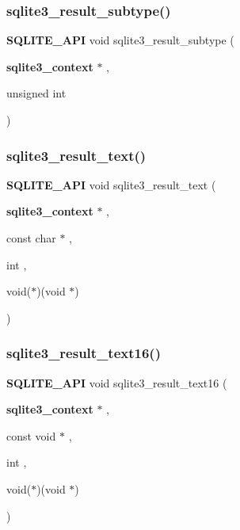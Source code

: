 \subsubsection{sqlite3\_result\_subtype()}
{\footnotesize\ttfamily \textbf{ S\+Q\+L\+I\+T\+E\+\_\+\+A\+PI} void sqlite3\+\_\+result\+\_\+subtype (\begin{DoxyParamCaption}\item[{\textbf{ sqlite3\+\_\+context} $\ast$}]{,  }\item[{unsigned int}]{ }\end{DoxyParamCaption})}

\mbox{\label{sqlite3_8h_a2c06bc83045bd7986b89e5e8bd689bdf}} 
\subsubsection{sqlite3\_result\_text()}
{\footnotesize\ttfamily \textbf{ S\+Q\+L\+I\+T\+E\+\_\+\+A\+PI} void sqlite3\+\_\+result\+\_\+text (\begin{DoxyParamCaption}\item[{\textbf{ sqlite3\+\_\+context} $\ast$}]{,  }\item[{const char $\ast$}]{,  }\item[{int}]{,  }\item[{void($\ast$)(void $\ast$)}]{ }\end{DoxyParamCaption})}

\mbox{\label{sqlite3_8h_af7d06a8a5c730d8d76a81994efd24741}} 
\subsubsection{sqlite3\_result\_text16()}
{\footnotesize\ttfamily \textbf{ S\+Q\+L\+I\+T\+E\+\_\+\+A\+PI} void sqlite3\+\_\+result\+\_\+text16 (\begin{DoxyParamCaption}\item[{\textbf{ sqlite3\+\_\+context} $\ast$}]{,  }\item[{const void $\ast$}]{,  }\item[{int}]{,  }\item[{void($\ast$)(void $\ast$)}]{ }\end{DoxyParamCaption})}

